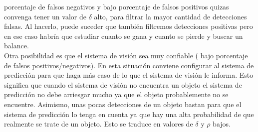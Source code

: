 	porcentaje de falsos negativos y bajo porcentaje de falsos 
	positivos quizas convenga tener un valor de $\delta$ alto, para 
	filtrar la mayor cantidad de detecciones falsas. Al hacerlo, puede 
	suceder que también filtremos detecciones positivas pero en ese 
	caso habría que estudiar cuanto se gana y cuanto se pierde y 
	buscar un balance.\\
	\indent Otra posibilidad es que el sistema de visión sea muy 
	confiable ( bajo porcentaje de falsos positivos/negativos). En 
	esta situación conviene configurar al sistema de predicción para 
	que haga más caso de lo que el sistema de visión le informa. Esto 
	significa que cuando el sistema de visión no encuentra un objeto 
	el sistema de predicción no debe arriesgar mucho ya que el objeto 
	probablemente no se encuentre. Asimismo, unas pocas detecciones de 
	un objeto bastan para que el sistema de predicción lo tenga 
	en cuenta  ya que hay una alta probabilidad de que 
	realmente se trate de un objeto. Esto se traduce en valores de 
	$\delta$ y $\rho$ bajos.
 



